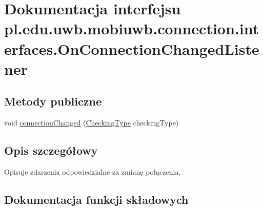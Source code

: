 \hypertarget{interfacepl_1_1edu_1_1uwb_1_1mobiuwb_1_1connection_1_1interfaces_1_1_on_connection_changed_listener}{}\section{Dokumentacja interfejsu pl.\+edu.\+uwb.\+mobiuwb.\+connection.\+interfaces.\+On\+Connection\+Changed\+Listener}
\label{interfacepl_1_1edu_1_1uwb_1_1mobiuwb_1_1connection_1_1interfaces_1_1_on_connection_changed_listener}
\subsection*{Metody publiczne}
\begin{DoxyCompactItemize}
\item 
void \hyperlink{interfacepl_1_1edu_1_1uwb_1_1mobiuwb_1_1connection_1_1interfaces_1_1_on_connection_changed_listener_a695ce81b658201cf3adb17626c51883c}{connection\+Changed} (\hyperlink{enumpl_1_1edu_1_1uwb_1_1mobiuwb_1_1connection_1_1_checking_type}{Checking\+Type} checking\+Type)
\end{DoxyCompactItemize}


\subsection{Opis szczegółowy}
Opisuje zdarzenia odpowiedzialne za zmianę połączenia. 

\subsection{Dokumentacja funkcji składowych}
\hypertarget{interfacepl_1_1edu_1_1uwb_1_1mobiuwb_1_1connection_1_1interfaces_1_1_on_connection_changed_listener_a695ce81b658201cf3adb17626c51883c}{}
